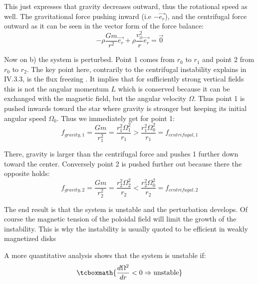 \documentclass[10pt,a4paper,english]{article}
\begin{document}
This just expresses that gravity decreases outward, thus the rotational speed
as well. The gravitational force pushing inward (i.e $-\vec{e_r}$), and the
centrifugal force  outward as it can be seen in the vector form of the force
balance:
\begin{equation}
    -\rho\frac{Gm}{r^2}\vec{e_r} + \rho\frac{v_{\phi}^2}{r}\vec{e_r} = \vec{0}
\end{equation}

Now on b) the system is perturbed. Point 1 comes from $r_0$ to $r_1$ and point
2 from $r_0$ to $r_2$. The key point here, contrarily to the centrifugal
instability explains in IV.3.3, is the flux freezing . It implies that for
sufficiently strong vertical fields this is not the angular momentum $ L$ which
is conserved because it can be exchanged with the magnetic field, but the
angular velocity $\Omega$. Thus point 1 is pushed inwards toward the star where
gravity is stronger but keeping its initial angular speed $\Omega_0$. Thus we
immediately get for point 1:
\begin{equation}
    f_{gravity,1} = \frac{Gm}{r_1^2} = \frac{r_1^2\Omega_1^2	}{r_1} >
    \frac{r_1^2\Omega_0^2}{r_1} = f_{centrifugal,1}
\end{equation}

There, gravity is larger than the centrifugal force and pushes 1 further  down
toward the center. Conversely point 2 is pushed further out because there the
opposite holds:
\begin{equation}
    f_{gravity,2} = \frac{Gm}{r_2^2} = \frac{r_2^2\Omega_2^2	}{r_2} <
    \frac{r_2^2\Omega_0^2}{r_2} = f_{centrifugal,2}
\end{equation}


The end result is that the system is unstable and the perturbation develops. Of
course the magnetic tension of the poloidal field will limit the growth of the
instability. This is why the instability is usually quoted to be efficient in
weakly magnetized disks

A more quantitative analysis shows that the system  is unstable if:
\begin{equation}
    \tcboxmath{\frac{d\Omega^2}{dr} < 0 \Rightarrow \text{unstable}}
\end{equation}
\end{document}
